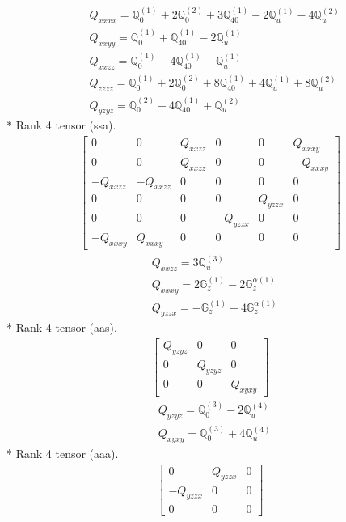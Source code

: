 \documentclass[fleqn,8pt,landscape]{jsarticle}
\begin{document}
\begin{align*}
& Q_{xxxx} = \mathbb{Q}_{0}^{(1)} + 2 \mathbb{Q}_{0}^{(2)} + 3 \mathbb{Q}_{40}^{(1)} - 2 \mathbb{Q}_{u}^{(1)} - 4 \mathbb{Q}_{u}^{(2)} \\
& Q_{xxyy} = \mathbb{Q}_{0}^{(1)} + \mathbb{Q}_{40}^{(1)} - 2 \mathbb{Q}_{u}^{(1)} \\
& Q_{xxzz} = \mathbb{Q}_{0}^{(1)} - 4 \mathbb{Q}_{40}^{(1)} + \mathbb{Q}_{u}^{(1)} \\
& Q_{zzzz} = \mathbb{Q}_{0}^{(1)} + 2 \mathbb{Q}_{0}^{(2)} + 8 \mathbb{Q}_{40}^{(1)} + 4 \mathbb{Q}_{u}^{(1)} + 8 \mathbb{Q}_{u}^{(2)} \\
& Q_{yzyz} = \mathbb{Q}_{0}^{(2)} - 4 \mathbb{Q}_{40}^{(1)} + \mathbb{Q}_{u}^{(2)}
\end{align*}
* Rank 4 tensor (ssa).
\begin{align*}
\begin{bmatrix} 0 & 0 & Q_{xxzz} & 0 & 0 & Q_{xxxy} \\ 0 & 0 & Q_{xxzz} & 0 & 0 & - Q_{xxxy} \\ - Q_{xxzz} & - Q_{xxzz} & 0 & 0 & 0 & 0 \\ 0 & 0 & 0 & 0 & Q_{yzzx} & 0 \\ 0 & 0 & 0 & - Q_{yzzx} & 0 & 0 \\ - Q_{xxxy} & Q_{xxxy} & 0 & 0 & 0 & 0 \end{bmatrix}
\end{align*}
\begin{align*}
& Q_{xxzz} = 3 \mathbb{Q}_{u}^{(3)} \\
& Q_{xxxy} = 2 \mathbb{G}_{z}^{(1)} - 2 \mathbb{G}_{z}^{\alpha(1)} \\
& Q_{yzzx} = - \mathbb{G}_{z}^{(1)} - 4 \mathbb{G}_{z}^{\alpha(1)}
\end{align*}
* Rank 4 tensor (aas).
\begin{align*}
\begin{bmatrix} Q_{yzyz} & 0 & 0 \\ 0 & Q_{yzyz} & 0 \\ 0 & 0 & Q_{xyxy} \end{bmatrix}
\end{align*}
\begin{align*}
& Q_{yzyz} = \mathbb{Q}_{0}^{(3)} - 2 \mathbb{Q}_{u}^{(4)} \\
& Q_{xyxy} = \mathbb{Q}_{0}^{(3)} + 4 \mathbb{Q}_{u}^{(4)}
\end{align*}
* Rank 4 tensor (aaa).
\begin{align*}
\begin{bmatrix} 0 & Q_{yzzx} & 0 \\ - Q_{yzzx} & 0 & 0 \\ 0 & 0 & 0 \end{bmatrix}
\end{align*}
\end{document}
